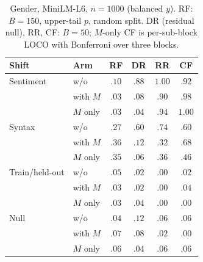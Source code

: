 \documentclass[11pt]{article}
\begin{document}
\begin{table}[ht]
\centering
\caption{Shift diagnostics on $M$ and embeddings. KS sig.\ $=$ meta features with
Bonferroni-significant two-sample KS; SMD $=$ standardized mean difference (b $-$ a);
AUC $=$ 5-fold logistic classifier separating the two groups.}
\label{tab:amazon_shift_diag}
\end{table}

\begin{table}[ht]
\centering
\caption{Gender, MiniLM-L6, $n{=}1000$ (balanced $y$). RF: $B{=}150$, upper-tail $p$,
random split. DR (residual null), RR, CF: $B{=}50$; $M$-only CF is per-sub-block LOCO
with Bonferroni over three blocks.}
\label{tab:gender_power}
\begin{tabular}{llcccc}
\toprule
Shift & Arm & RF & DR & RR & CF \\
\midrule
Sentiment & w/o & $.10$ & $.88$ & $1.00$ & $.92$ \\
 & with $M$ & $.03$ & $.08$ & $.90$ & $.98$ \\
 & $M$ only & $.03$ & $.04$ & $.94$ & $1.00$ \\
\midrule
Syntax & w/o & $.27$ & $.60$ & $.74$ & $.60$ \\
 & with $M$ & $.36$ & $.12$ & $.32$ & $.68$ \\
 & $M$ only & $.35$ & $.06$ & $.36$ & $.46$ \\
\midrule
Train/held-out & w/o & $.05$ & $.02$ & $.00$ & $.02$ \\
 & with $M$ & $.03$ & $.02$ & $.00$ & $.04$ \\
 & $M$ only & $.03$ & $.04$ & $.00$ & $.00$ \\
\midrule
Null & w/o & $.04$ & $.12$ & $.06$ & $.06$ \\
 & with $M$ & $.07$ & $.08$ & $.02$ & $.00$ \\
 & $M$ only & $.06$ & $.04$ & $.06$ & $.06$ \\
\bottomrule
\end{tabular}
\end{table}
\end{document}
